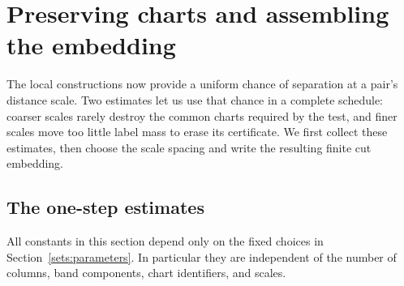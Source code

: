 \section{Preserving charts and assembling the embedding}
\label{pad:assembly}

The local constructions now provide a uniform chance of separation at a
pair's distance scale. Two estimates let us use that chance in a complete
schedule: coarser scales rarely destroy the common charts required by the
test, and finer scales move too little label mass to erase its certificate.
We first collect these estimates, then choose the scale spacing and write
the resulting finite cut embedding.

\subsection{The one-step estimates}
All constants in this section depend only on the fixed choices in
Section~\ref{sets:parameters}. In particular they are independent of the
number of columns, band components, chart identifiers, and scales.

